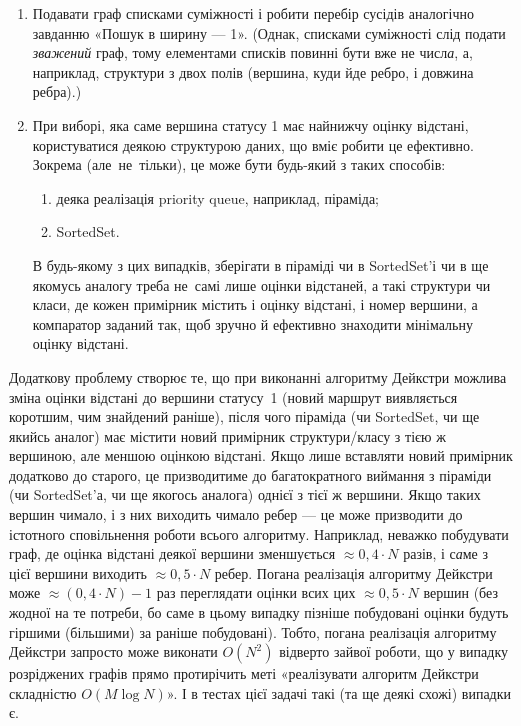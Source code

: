 \begin{enumerate}
\item
Подавати граф списками суміжності і робити перебір сусідів аналогічно завданню «Пошук в ширину — 1».
(Однак, списками суміжності слід подати {\it зважений} граф, тому елементами списків повинні бути вже не числ{\it а}, а, наприклад, структури з двох полів (вершина, куди йде ребро, і довжина ребра).)

\item
При виборі, яка саме вершина статусу 1 має найнижчу оцінку відстані, користуватися деякою структурою даних, що вміє робити це ефективно. Зокрема (але~не~тільки), це може бути будь-який з таких способів:
\begin{enumerate}
\item
деяка реалізація priority queue, наприклад, піраміда;
\item
SortedSet.
\end{enumerate}
В будь-якому з цих випадків, зберігати в піраміді чи в SortedSet'і чи в ще якомусь аналогу треба не~самі лише оцінки відстаней, а такі структури чи класи, де кожен примірник містить і оцінку відстані, і номер вершини, а компаратор заданий так, щоб зручно й ефективно знаходити мінімальну оцінку відстані.
\end{enumerate}

Додаткову проблему створює те, що при виконанні алгоритму Дейкстри можлива зміна оцінки відстані до вершини статусу~1 (новий маршрут виявляється коротшим, чим знайдений раніше), після чого піраміда (чи SortedSet, чи ще якийсь аналог) має містити новий примірник структури/класу з тією ж вершиною, але меншою оцінкою відстані. Якщо лише вставляти новий примірник додатково до старого, це призводитиме до багатократного виймання з піраміди (чи SortedSet'а, чи ще якогось аналога) однієї з тієї ж вершини. Якщо таких вершин чимало, і з них виходить чимало ребер --- це може призводити до істотного сповільнення роботи всього алгоритму. Наприклад, неважко побудувати граф, де оцінка відстані деякої вершини зменшується $\approx0,4\cdot N$ разів, і с{\it а}ме з цієї вершини виходить $\approx0,5\cdot N$ ребер. Погана реалізація алгоритму Дейкстри може $\approx(0,4\cdot N)-1$ раз переглядати оцінки всих цих $\approx0,5\cdot N$ вершин (без жодної на те потреби, бо саме в цьому випадку пізніше побудовані оцінки будуть гіршими (більшими) за раніше побудовані). Тобто, погана реалізація алгоритму Дейкстри запросто може виконати $O(N^2)$ відверто зайвої роботи, що у випадку розріджених графів прямо протирічить меті «реалізувати алгоритм Дейкстри складністю $O(M\log N)$». І в тестах цієї задачі такі (та ще деякі схожі) випадки є.

